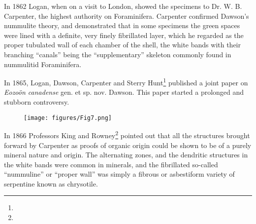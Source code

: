 \documentclass[a4paper, 12pt, oneside]{article}
\begin{document}
In 1862 Logan, when on a visit to London, showed the specimens to Dr. W. B. Carpenter, the highest authority on Foraminifera. Carpenter confirmed Dawson's nummulite theory, and demonstrated that in some specimens the green spaces were lined with a definite, very finely fibrillated layer, which he regarded as the proper tubulated wall of each chamber of the shell, the white bands with their branching ``canals'' being the ``supplementary'' skeleton commonly found in nummulitid Foraminifera.

In 1865, Logan, Dawson, Carpenter and Sterry Hunt\footnote{} published a joint paper on \emph{Eozoön canadense} gen. et sp. nov. Dawson. This paper started a prolonged and stubborn controversy.
\begin{figure}[H]
\centering
\texttt{[image: figures/Fig7.png]}
\caption*{}
\end{figure}
In 1866 Professors King and Rowney\footnote{} pointed out that all the structures brought forward by Carpenter as proofs of organic origin could be shown to be of a purely mineral nature and origin. The alternating zones, and the dendritic structures in the white bands were common in minerals, and the fibrillated so-called ``nummuline'' or ``proper wall'' was simply a fibrous or asbestiform variety of serpentine known as chrysotile.
\end{document}
